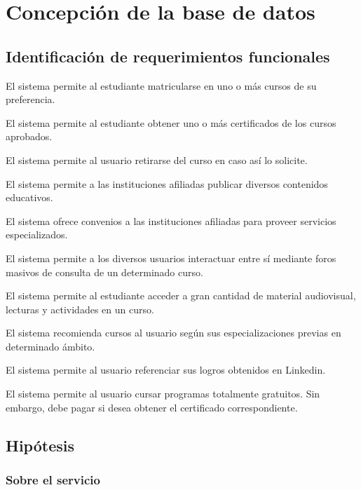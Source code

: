 \documentclass[../main.tex]{subfiles}
\begin{document}
\section{Concepción de la base de datos}

\subsection{Identificación de requerimientos funcionales}

\begin{enumeratedtable}[prefix=F]
  \item{El sistema permite al estudiante matricularse en uno o más cursos de su preferencia.}
  \item{El sistema permite al estudiante obtener uno o más certificados de los cursos aprobados.}
  \item{El sistema permite al usuario retirarse del curso en caso así lo solicite.}
  \item{El sistema permite a las instituciones afiliadas publicar diversos contenidos educativos.}
  \item{El sistema ofrece convenios a las instituciones afiliadas para proveer servicios especializados.}
  \item{El sistema permite a los diversos usuarios interactuar entre sí mediante foros masivos de consulta de un determinado curso.}
  \item{El sistema permite al estudiante acceder a gran cantidad de material audiovisual, lecturas y actividades en un curso.}
  \item{El sistema recomienda cursos al usuario según sus especializaciones previas en determinado ámbito.}
  \item{El sistema permite al usuario referenciar sus logros obtenidos en Linkedin.}
  \item{El sistema permite al usuario cursar programas totalmente gratuitos. Sin embargo, debe pagar si desea obtener el certificado correspondiente.}
\end{enumeratedtable}

\subsection{Hipótesis}

\subsubsection{Sobre el servicio}
\end{document}
